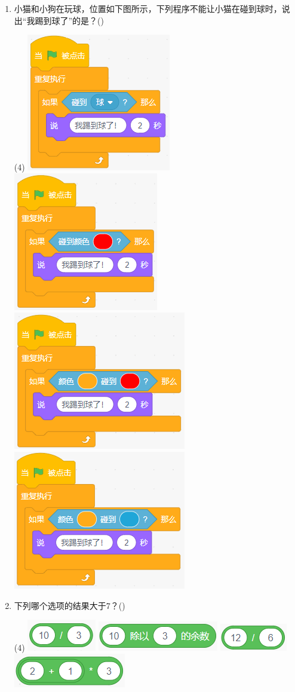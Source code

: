 \documentclass[10pt, a4paper]{article}
\newcommand{\hq}{\hfill(\qquad)}
\begin{document}
\begin{enumerate}
        \newpage
        \item 小猫和小狗在玩球，位置如下图所示，下列程序不能让小猫在碰到球时，说出“我踢到球了”的是？\hq
        \begin{tasks}(4)
            \task \includegraphics[width=.15\textwidth]{figure/15a.png}
            \task \includegraphics[width=.15\textwidth]{figure/15b.png}
            \task \includegraphics[width=.17\textwidth]{figure/15c.png}
            \task \includegraphics[width=.17\textwidth]{figure/15d.png}
        \end{tasks}

        \item 下列哪个选项的结果大于7？\hq
        \begin{tasks}(4)
            \task \includegraphics[width=.1\textwidth]{figure/16a.png}
            \task \includegraphics[width=.16\textwidth]{figure/16b.png}
            \task \includegraphics[width=.1\textwidth]{figure/16c.png}
            \task \includegraphics[width=.15\textwidth]{figure/16d.png}
        \end{tasks}


\end{enumerate}
\end{document}

